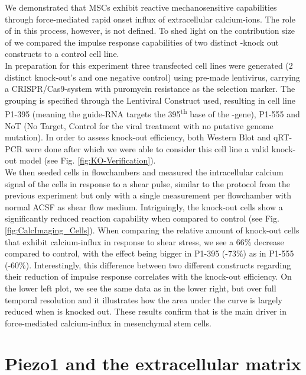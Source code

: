 We demonstrated that MSCs exhibit reactive mechanosensitive capabilities through force-mediated rapid onset influx of extracellular calcium-ions. The role of \Piezo{} in this process, however, is not defined. To shed light on the contribution size of \Piezo{} we compared the impulse response capabilities of two distinct \Piezo{}-knock out constructs to a control cell line.\\
In preparation for this experiment three transfected cell lines were generated (2 distinct \Piezo{} knock-out's and one negative control) using pre-made lentivirus, carrying a CRISPR/Cas9-system with puromycin resistance as the selection marker. The grouping is specified through the Lentiviral Construct used, resulting in cell line P1-395 (meaning the guide-RNA targets the 395\textsuperscript{th} base of the \Piezo{}-gene), P1-555 and NoT (No Target, Control for the viral treatment with no putative genome mutation).  In order to assess knock-out efficiency, both Western Blot and qRT-PCR were done after which we were able to consider this cell line a valid knock-out model (see Fig. \ref{fig:KO-Verification}).\\
We then seeded cells in flowchambers and measured the intracellular calcium signal of the cells in response to a shear pulse, similar to the protocol from the previous experiment but only with a single measurement per flowchamber with normal ACSF as shear flow medium. Intriguingly, the knock-out cells show a significantly reduced reaction capability when compared to control (see Fig. \ref{fig:CalcImaging_Cells}). When comparing the relative amount of knock-out cells that exhibit calcium-influx in response to shear stress, we see a 66\% decrease compared to control, with the effect being bigger in P1-395 (-73\%) as in P1-555 (-60\%). Interestingly, this difference between two different constructs regarding their reduction of impulse response correlates with the knock-out efficiency. On the lower left plot, we see the same data as in the lower right, but over full temporal resolution and it illustrates how the area under the curve is largely reduced when \Piezo{} is knocked out. 
These results confirm that \Piezo{} is the main driver in force-mediated calcium-influx in mesenchymal stem cells.


\section{Piezo1 and the extracellular matrix}
\label{sec:PiezoandECM}



